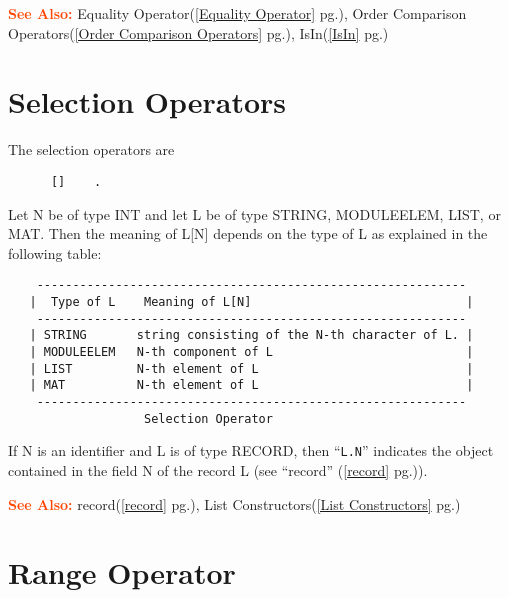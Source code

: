 \documentclass[a4paper]{mybook}
\newcommand\SeeAlso{\par\textcolor{OrangeRed}{\textbf{\large See Also: }}}
\begin{document}
        

\SeeAlso %
  Equality Operator(\ref{Equality Operator} pg.\pageref{Equality Operator}), 
    Order Comparison Operators(\ref{Order Comparison Operators} pg.\pageref{Order Comparison Operators}), 
    IsIn(\ref{IsIn} pg.\pageref{IsIn})

\section{Selection Operators}
\label{Selection Operators}

        
The selection operators are
\begin{verbatim}
      []    .
\end{verbatim}
Let N be of type INT and let L be of type STRING, MODULEELEM, LIST, or
MAT.  Then the meaning of L[N] depends on the type of L as explained
in the following table:
\begin{verbatim}
    ------------------------------------------------------------
   |  Type of L    Meaning of L[N]                              |
    ------------------------------------------------------------
   | STRING       string consisting of the N-th character of L. |
   | MODULEELEM   N-th component of L                           |
   | LIST         N-th element of L                             |
   | MAT          N-th element of L                             |
    ------------------------------------------------------------
                   Selection Operator
\end{verbatim}
If N is an identifier and L is of type RECORD, then ``\verb&L.N&'' indicates the
object contained in the field N of the record L (see ``record'' (\ref{record} pg.\pageref{record})).
	
\SeeAlso %
  record(\ref{record} pg.\pageref{record}), 
    List Constructors(\ref{List Constructors} pg.\pageref{List Constructors})

\section{Range Operator}
\label{Range Operator}
\end{document}
